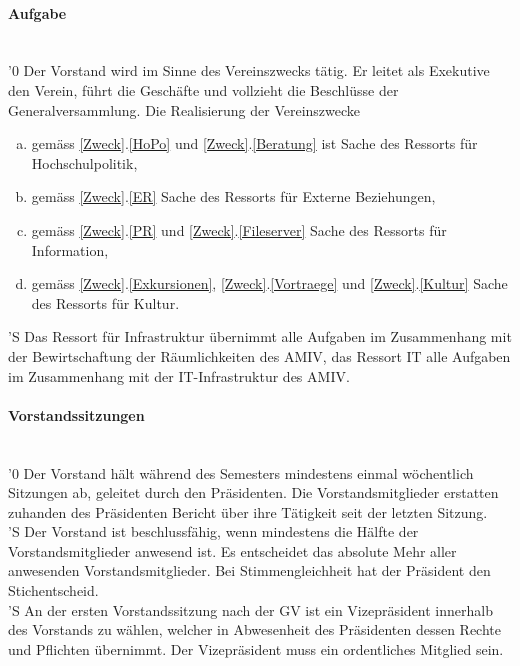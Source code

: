 \documentclass[a4paper,11pt]{article}
\newcommand{\nl}{\\[1.5ex]}
\begin{document}
\paragraph{Aufgabe} \ \\
'0 Der Vorstand wird im Sinne des Vereinszwecks tätig. Er leitet als Exekutive den Verein, führt die Geschäfte und vollzieht die Beschlüsse der Generalversammlung. Die Realisierung der Vereinszwecke
\begin{enumerate}[(a)]
  \item gemäss \ref{Zweck}.\ref{HoPo} und \ref{Zweck}.\ref{Beratung} ist Sache des Ressorts für Hochschulpolitik,
  \item gemäss \ref{Zweck}.\ref{ER} Sache des Ressorts für Externe Beziehungen,
  \item gemäss \ref{Zweck}.\ref{PR} und \ref{Zweck}.\ref{Fileserver} Sache des Ressorts für Information,
  \item gemäss \ref{Zweck}.\ref{Exkursionen}, \ref{Zweck}.\ref{Vortraege} und \ref{Zweck}.\ref{Kultur} Sache des Ressorts für Kultur. %
\end{enumerate}
'S Das Ressort für Infrastruktur übernimmt alle Aufgaben im Zusammenhang mit der Bewirtschaftung der Räumlichkeiten des AMIV, das Ressort IT alle Aufgaben im Zusammenhang mit der IT-Infrastruktur des AMIV.


\paragraph{Vorstandssitzungen} \ \\
'0 Der Vorstand hält während des Semesters mindestens einmal wöchentlich Sitzungen ab, geleitet durch den Präsidenten. Die Vorstandsmitglieder erstatten zuhanden des Präsidenten Bericht über ihre Tätigkeit seit der letzten Sitzung.\nl
'S Der Vorstand ist beschlussfähig, wenn mindestens die Hälfte der Vorstandsmitglieder anwesend ist. Es entscheidet das absolute Mehr aller anwesenden Vorstandsmitglieder. Bei Stimmengleichheit hat der Präsident den Stichentscheid.\nl
'S An der ersten Vorstandssitzung nach der GV ist ein Vizepräsident innerhalb des Vorstands zu wählen, welcher in Abwesenheit des Präsidenten dessen Rechte und Pflichten übernimmt. Der Vizepräsident muss ein ordentliches Mitglied sein.
\end{document}
